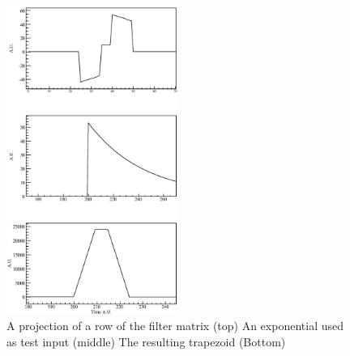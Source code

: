 \documentclass[twocolumn,preprintnumbers,superscriptaddress,amsmath,amssymb,floatfix]{revtex4-1}
\begin{document}
\begin{figure}
\includegraphics[width=0.5\textwidth]{filter_function_example.eps}
\caption{A projection of a row of the filter matrix (top) An exponential used as test input (middle) The resulting trapezoid (Bottom) \label{filter_func}}
\end{figure}
\end{document}
